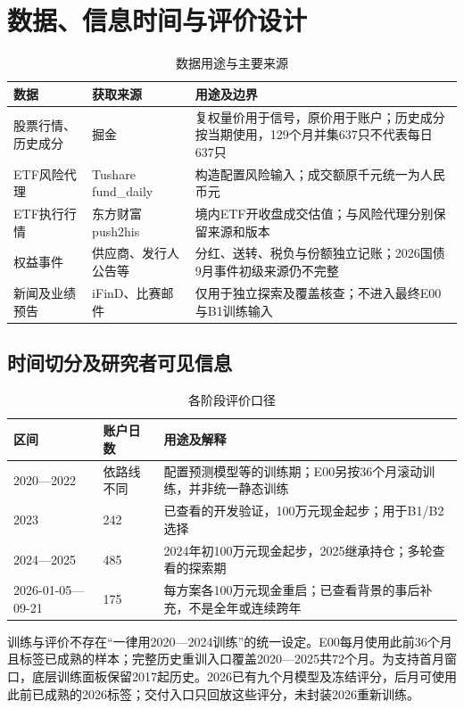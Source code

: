 \documentclass[11pt,a4paper]{article}
\begin{document}
\section{数据、信息时间与评价设计}
\begin{table}[htbp]\centering\small
\caption{数据用途与主要来源}\label{tab:data}
\begin{tabular}{@{}p{3.0cm}p{3.1cm}p{8.2cm}@{}}\toprule
数据 & 获取来源 & 用途及边界 \\\midrule
股票行情、历史成分 & 掘金 & 复权量价用于信号，原价用于账户；历史成分按当期使用，129个月并集637只不代表每日637只 \\
ETF风险代理 & Tushare fund\_daily & 构造配置风险输入；成交额原千元统一为人民币元 \\
ETF执行行情 & 东方财富push2his & 境内ETF开收盘成交估值；与风险代理分别保留来源和版本 \\
权益事件 & 供应商、发行人公告等 & 分红、送转、税负与份额独立记账；2026国债9月事件初级来源仍不完整 \\
新闻及业绩预告 & iFinD、比赛邮件 & 仅用于独立探索及覆盖核查；不进入最终E00与B1训练输入 \\
\bottomrule\end{tabular}\end{table}

\subsection{时间切分及研究者可见信息}
\begin{table}[htbp]\centering\small
\caption{各阶段评价口径}\label{tab:periods}
\begin{tabular}{@{}p{3.3cm}p{2.0cm}p{8.9cm}@{}}\toprule
区间 & 账户日数 & 用途及解释 \\\midrule
2020—2022 & 依路线不同 & 配置预测模型等的训练期；E00另按36个月滚动训练，并非统一静态训练 \\
2023 & 242 & 已查看的开发验证，100万元现金起步；用于B1/B2选择 \\
2024—2025 & 485 & 2024年初100万元现金起步，2025继承持仓；多轮查看的探索期 \\
2026-01-05—09-21 & 175 & 每方案各100万元现金重启；已查看背景的事后补充，不是全年或连续跨年 \\
\bottomrule\end{tabular}\end{table}

训练与评价不存在“一律用2020—2024训练”的统一设定。E00每月使用此前36个月且标签已成熟的样本；完整历史重训入口覆盖2020—2025共72个月。为支持首月窗口，底层训练面板保留2017起历史。2026已有九个月模型及冻结评分，后月可使用此前已成熟的2026标签；交付入口只回放这些评分，未封装2026重新训练。
\end{document}
